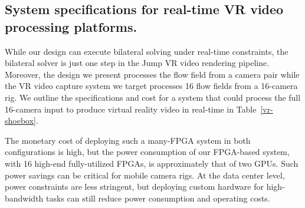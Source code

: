 \subsection{System specifications for real-time VR video processing platforms.}
While our design can execute bilateral solving under real-time constraints, the bilateral solver is just one step in the Jump VR video rendering pipeline.
Moreover, the design we present processes the flow field from a camera pair while the VR video capture system we target processes 16 flow fields from a 16-camera rig.
We outline the specifications and cost for a system that could process the full 16-camera input to produce virtual reality video in real-time in Table~\ref{vr-shoebox}.
\begin{table}
\centering
\label{vr-shoebox}
\caption{Full-system specification for an end-to-end real-time VR pipeline}


\end{table}


The monetary cost of deploying such a many-FPGA system in both configurations is high, but the power consumption of our FPGA-based system, with 16 high-end fully-utilized FPGAs, is approximately that of two GPUs.
Such power savings can be critical for mobile camera rigs.
At the data center level, power constraints are less stringent, but deploying custom hardware for high-bandwidth tasks can still reduce power consumption and operating costs.

